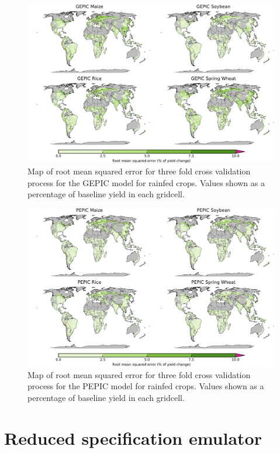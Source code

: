 \documentclass[10pt]{article}
\begin{document}
\begin{figure}[h!]
\centering
\includegraphics[width=15.5cm]{GEPIC_spatial_MSE_ton_ha.png}
\caption{Map of root mean squared error for three fold cross validation process for the GEPIC model for rainfed crops. Values shown as a percentage of baseline yield in each gridcell.}
\label{fig:pdssatrmse}
\end{figure}

\begin{figure}[h!]
\centering
\includegraphics[width=15.5cm]{PEPIC_spatial_MSE_ton_ha.png}
\caption{Map of root mean squared error for three fold cross validation process for the PEPIC model for rainfed crops. Values shown as a percentage of baseline yield in each gridcell.}
\label{fig:pdssatrmse}
\end{figure}

\clearpage
\section{Reduced specification emulator}
\end{document}
